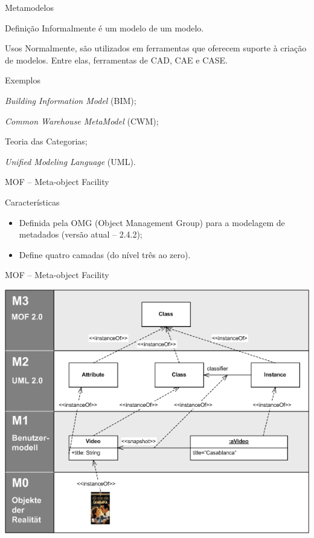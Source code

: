 \documentclass[12pt,t]{beamer}
\begin{document}
	 	\begin{frame}{Metamodelos}
	 		\begin{block}{Definição}
	 			Informalmente é um modelo de um modelo.
	 		\end{block}
	 		\begin{block}{Usos}
	 			Normalmente, são utilizados em ferramentas que oferecem suporte à criação de modelos. Entre elas, ferramentas de CAD, CAE e CASE.
	 		\end{block}
	 		\begin{exampleblock}{Exemplos}
	 			\begin{description}[Datawarehousing]
	 			\item [Construção Civil] \emph{Building Information Model} (BIM);
	 			\item [Datawarehousing]		
	 		\emph{Common Warehouse MetaModel} (CWM);
	 			\item [Matemática] Teoria das Categorias;
	 			\item [Programas OO] \emph{Unified Modeling Language} (UML).
	 		\end{description}
		\end{exampleblock}
	 \end{frame}
	 \begin{frame}{MOF -- Meta-object Facility}
	 	\begin{block}{Características}
	 		\begin{itemize}
	 			\item Definida pela OMG (Object Management Group) para a modelagem de metadados (versão atual -- 2.4.2);
	 			\item Define quatro camadas (do nível três ao zero).	
	 		\end{itemize}
	 	\end{block}	 
     \end{frame}
	 \begin{frame}{MOF -- Meta-object Facility}
 	 		\centerline{\includegraphics[totalheight=0.85\textheight]{MOF.png}}
	 \end{frame}
\end{document}

